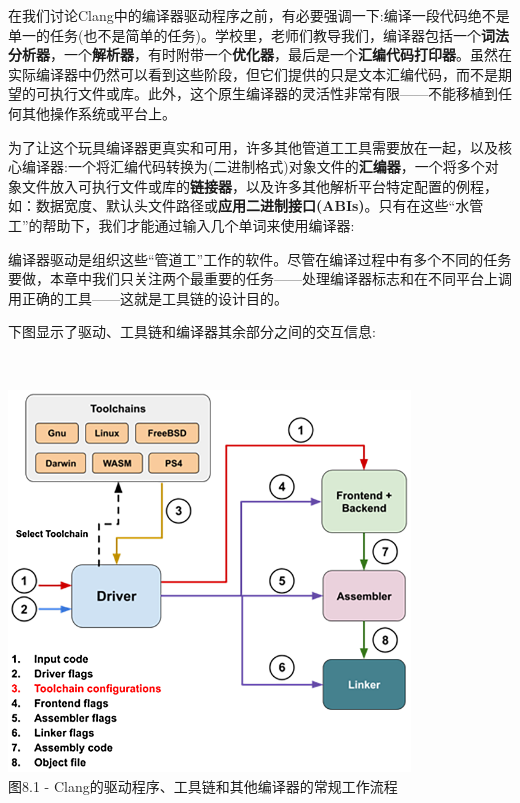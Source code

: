 在我们讨论Clang中的编译器驱动程序之前，有必要强调一下:编译一段代码绝不是单一的任务(也不是简单的任务)。学校里，老师们教导我们，编译器包括一个\textbf{词法分析器}，一个\textbf{解析器}，有时附带一个\textbf{优化器}，最后是一个\textbf{汇编代码打印器}。虽然在实际编译器中仍然可以看到这些阶段，但它们提供的只是文本汇编代码，而不是期望的可执行文件或库。此外，这个原生编译器的灵活性非常有限——不能移植到任何其他操作系统或平台上。

为了让这个玩具编译器更真实和可用，许多其他管道工工具需要放在一起，以及核心编译器:一个将汇编代码转换为(二进制格式)对象文件的\textbf{汇编器}，一个将多个对象文件放入可执行文件或库的\textbf{链接器}，以及许多其他解析平台特定配置的例程，如：数据宽度、默认头文件路径或\textbf{应用二进制接口(ABIs)}。只有在这些“水管工”的帮助下，我们才能通过输入几个单词来使用编译器:


编译器驱动是组织这些“管道工”工作的软件。尽管在编译过程中有多个不同的任务要做，本章中我们只关注两个最重要的任务——处理编译器标志和在不同平台上调用正确的工具——这就是工具链的设计目的。

下图显示了驱动、工具链和编译器其余部分之间的交互信息:

\hspace*{\fill} \\ %
\begin{center}
\includegraphics[width=0.8\textwidth]{content/2/chapter8/images/1.png}\\
图8.1 - Clang的驱动程序、工具链和其他编译器的常规工作流程
\end{center}

